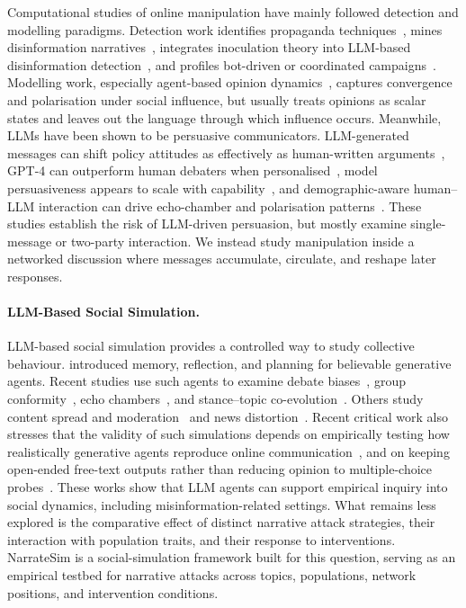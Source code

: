 Computational studies of online manipulation have mainly followed detection and modelling paradigms. Detection work identifies propaganda techniques~\citep{DaSanMartino2019}, mines disinformation narratives~\citep{sosnowski-etal-2025-dinam}, integrates inoculation theory into LLM-based disinformation detection~\citep{modzelewski-etal-2026-malicious}, and profiles bot-driven or coordinated campaigns~\citep{Ferrara2016,Woolley2018}. Modelling work, especially agent-based opinion dynamics~\citep{Deffuant2000,Flache2017}, captures convergence and polarisation under social influence, but usually treats opinions as scalar states and leaves out the language through which influence occurs. Meanwhile, LLMs have been shown to be persuasive communicators. LLM-generated messages can shift policy attitudes as effectively as human-written arguments~\citep{Bai2025}, GPT-4 can outperform human debaters when personalised~\citep{Salvi2025}, model persuasiveness appears to scale with capability~\citep{pauli-etal-2025-measuring}, and demographic-aware human--LLM interaction can drive echo-chamber and polarisation patterns~\citep{borah-etal-2026-persuasion}. These studies establish the risk of LLM-driven persuasion, but mostly examine single-message or two-party interaction. We instead study manipulation inside a networked discussion where messages accumulate, circulate, and reshape later responses.

\paragraph{LLM-Based Social Simulation.}

LLM-based social simulation provides a controlled way to study collective behaviour. \citet{Park2023} introduced memory, reflection, and planning for believable generative agents. Recent studies use such agents to examine debate biases~\citep{taubenfeld-etal-2024-systematic}, group conformity~\citep{choi-etal-2025-empirical}, echo chambers~\citep{wang-etal-2025-decoding}, and stance--topic co-evolution~\citep{zhang-etal-2025-spark}. Others study content spread and moderation~\citep{liu-etal-2025-mosaic} and news distortion~\citep{liu-etal-2025-stepwise}. Recent critical work also stresses that the validity of such simulations depends on empirically testing how realistically generative agents reproduce online communication~\citep{munker-etal-2026-dont}, and on keeping open-ended free-text outputs rather than reducing opinion to multiple-choice probes~\citep{ma-etal-2026-open}. These works show that LLM agents can support empirical inquiry into social dynamics, including misinformation-related settings. What remains less explored is the comparative effect of distinct narrative attack strategies, their interaction with population traits, and their response to interventions. NarrateSim is a social-simulation framework built for this question, serving as an empirical testbed for narrative attacks across topics, populations, network positions, and intervention conditions.
